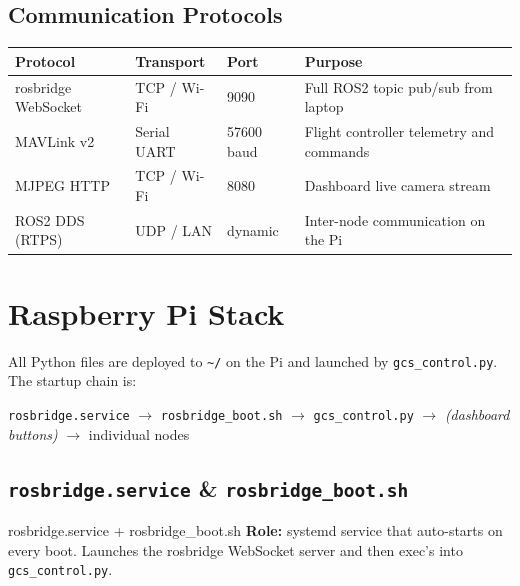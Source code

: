 \documentclass[11pt,a4paper]{article}
\begin{document}
\subsection{Communication Protocols}

\begin{center}
\begin{tabular}{lllp{5.5cm}}
  \toprule
  \textbf{Protocol} & \textbf{Transport} & \textbf{Port} & \textbf{Purpose} \\
  \midrule
  rosbridge WebSocket & TCP / Wi-Fi & 9090 & Full ROS2 topic pub/sub from laptop \\
  MAVLink v2 & Serial UART & 57600 baud & Flight controller telemetry and commands \\
  MJPEG HTTP & TCP / Wi-Fi & 8080 & Dashboard live camera stream \\
  ROS2 DDS (RTPS) & UDP / LAN & dynamic & Inter-node communication on the Pi \\
  \bottomrule
\end{tabular}
\end{center}

\section{Raspberry Pi Stack}

All Python files are deployed to \texttt{\textasciitilde/} on the Pi and
launched by \texttt{gcs\_control.py}. The startup chain is:

\begin{center}
\texttt{rosbridge.service} $\to$ \texttt{rosbridge\_boot.sh} $\to$
\texttt{gcs\_control.py} $\to$ \emph{(dashboard buttons)} $\to$ individual nodes
\end{center}

\subsection{\texttt{rosbridge.service} \& \texttt{rosbridge\_boot.sh}}

\begin{filebox}{rosbridge.service + rosbridge\_boot.sh}
\textbf{Role:} systemd service that auto-starts on every boot.
Launches the rosbridge WebSocket server and then exec's into \texttt{gcs\_control.py}.
\end{filebox}
\end{document}

